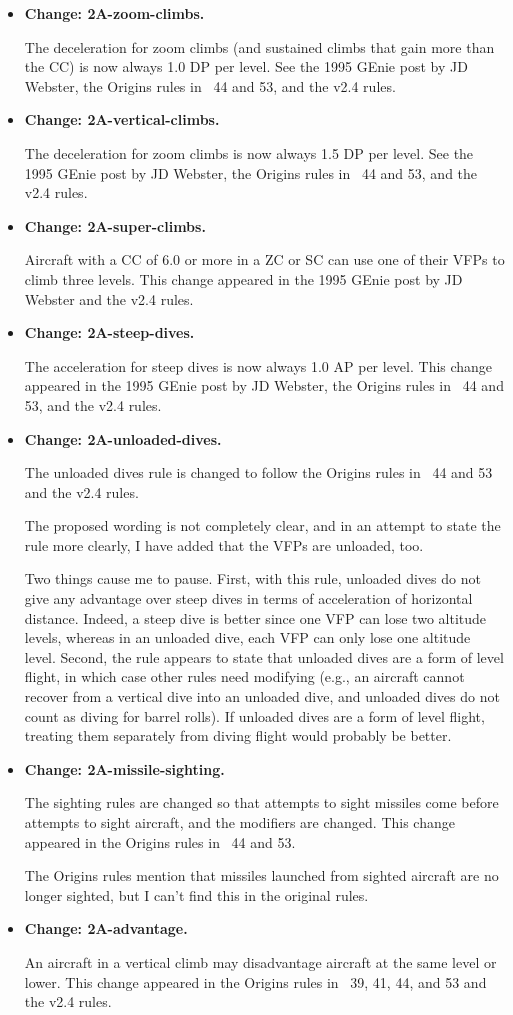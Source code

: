 \documentclass[10pt]{article}
\newcommand{\itemtag}[1]{\item \textbf{Change: #1.}\par}
\begin{document}
\begin{itemize}
    \itemtag{2A-zoom-climbs} The deceleration for zoom climbs (and sustained climbs that gain more than the CC) is now always 1.0 DP per level. See the 1995 GEnie post by JD Webster, the Origins rules {in \APJ}~44 and 53, and the v2.4 rules.

    \itemtag{2A-vertical-climbs} The deceleration for zoom climbs is now always 1.5 DP per level. See the 1995 GEnie post by JD Webster, the Origins rules {in \APJ}~44 and 53, and the v2.4 rules.

    \itemtag{2A-super-climbs} Aircraft with a CC of 6.0 or more in a ZC or SC can use one of their VFPs to climb three levels. This change appeared in the 1995 GEnie post by JD Webster and the v2.4 rules.

    \itemtag{2A-steep-dives} The acceleration for steep dives is now always 1.0 AP per level. This change appeared in the 1995 GEnie post by JD Webster, the Origins rules in {\APJ}~44 and 53, and the v2.4 rules.

    \itemtag{2A-unloaded-dives} The unloaded dives rule is changed to follow the Origins rules in {\APJ}~44 and 53 and the v2.4 rules.
    
    The proposed wording is not completely clear, and in an attempt to state the rule more clearly, I have added that the VFPs are unloaded, too. 
    
    Two things cause me to pause. First, with this rule, unloaded dives do not give any advantage over steep dives in terms of acceleration of horizontal distance. Indeed, a steep dive is better since one VFP can lose two altitude levels, whereas in an unloaded dive, each VFP can only lose one altitude level. Second, the rule appears to state that unloaded dives are a form of level flight, in which case other rules need modifying (e.g., an aircraft cannot recover from a vertical dive into an unloaded dive, and unloaded dives do not count as diving for barrel rolls). If unloaded dives are a form of level flight, treating them separately from diving flight would probably be better.

    \itemtag{2A-missile-sighting} The sighting rules are changed so that attempts to sight missiles come before attempts to sight aircraft, and the modifiers are changed. This change appeared in the Origins rules in {\APJ}~44 and 53.
    
    The Origins rules mention that missiles launched from sighted aircraft are no longer sighted, but I can’t find this in the original rules.

    \itemtag{2A-advantage} An aircraft in a vertical climb may disadvantage aircraft at the same level or lower. This change appeared in the Origins rules in {\APJ}~39, 41, 44, and 53 and the v2.4 rules.


\end{itemize}
\end{document}
